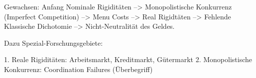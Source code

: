 Gewachsen: Anfang Nominale Rigiditäten --> Monopolistische Konkurrenz (Imperfect Competition) --> Menu Costs --> Real Rigidtäten --> Fehlende Klassische Dichotomie --> Nicht-Neutralität des Geldes.

Dazu Spezial-Forschungsgebiete: 

1. Reale Rigiditäten: Arbeitsmarkt, Kreditmarkt, Gütermarkt
2. Monopolistische Konkurrenz: Coordination Failures (Überbegriff)
